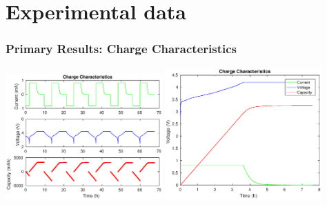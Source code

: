 \documentclass{beamer}
\begin{document}





\section{Experimental data}
\begin{frame}
\frametitle{Primary Results: Charge Characteristics}
\includegraphics[width=6cm]{ChargeCharacteristicAllCycle-C.eps}
\includegraphics[width=6cm]{ChargeCharacteristicOneCycle-C.eps}
\end{frame}
\end{document}

